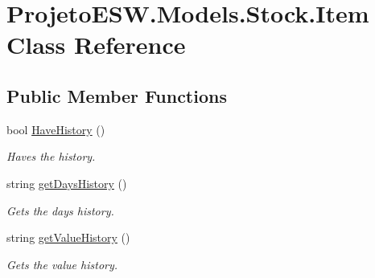 \hypertarget{class_projeto_e_s_w_1_1_models_1_1_stock_1_1_item}{}\section{Projeto\+E\+S\+W.\+Models.\+Stock.\+Item Class Reference}
\label{class_projeto_e_s_w_1_1_models_1_1_stock_1_1_item}
\subsection*{Public Member Functions}
\begin{DoxyCompactItemize}
\item 
bool \mbox{\hyperlink{class_projeto_e_s_w_1_1_models_1_1_stock_1_1_item_a062139d2d59dcf23038fbfc5c3c6aafa}{Have\+History}} ()
\begin{DoxyCompactList}\small\item\em Haves the history.\end{DoxyCompactList}\item 
string \mbox{\hyperlink{class_projeto_e_s_w_1_1_models_1_1_stock_1_1_item_af0079277187ad6397238b783a6adac14}{get\+Days\+History}} ()
\begin{DoxyCompactList}\small\item\em Gets the days history.\end{DoxyCompactList}\item 
string \mbox{\hyperlink{class_projeto_e_s_w_1_1_models_1_1_stock_1_1_item_ac246777d438d2efb928e3f610abf913b}{get\+Value\+History}} ()
\begin{DoxyCompactList}\small\item\em Gets the value history.\end{DoxyCompactList}\end{DoxyCompactItemize}

